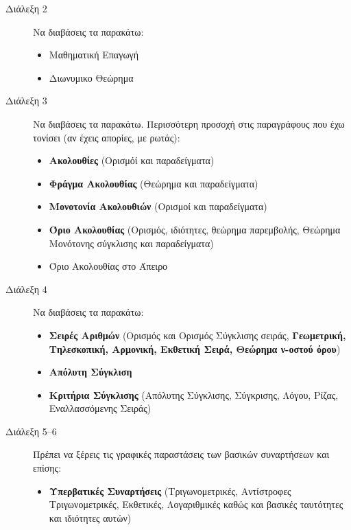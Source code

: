 \documentclass[a4paper,12pt]{article}
\begin{document}
\begin{center}
\end{center}

\vspace{\baselineskip}

\begin{description}
    \item[Διάλεξη 2] Να διαβάσεις τα παρακάτω:
  \begin{itemize}
    \item Μαθηματική Επαγωγή
    \item Διωνυμικο Θεώρημα
  \end{itemize}

  \item[Διάλεξη 3] Να διαβάσεις τα παρακάτω. Περισσότερη προσοχή
  στις παραγράφους που έχω τονίσει (αν έχεις απορίες, με ρωτάς):
  \begin{itemize}
    \item \textbf{Ακολουθίες} (Ορισμόί και παραδείγματα)
    \item \textbf{Φράγμα Ακολουθίας} (Θεώρημα και παραδείγματα)
    \item \textbf{Μονοτονία Ακολουθιών} (Ορισμοί και παραδείγματα)
    \item \textbf{Όριο Ακολουθίας} (Ορισμός, ιδιότητες, θεώρημα παρεμβολής,
    Θεώρημα
    Μονότονης σύγκλισης και παραδείγματα)
    \item {Όριο Ακολουθίας στο Άπειρο}
  \end{itemize}
  \item[Διάλεξη 4] Να διαβάσεις τα παρακάτω:
  \begin{itemize}
    \item \textbf{Σειρές Αριθμών} (Ορισμός και Ορισμός Σύγκλισης σειράς,
    \textbf{Γεωμετρική, Τηλεσκοπική, Αρμονική, Εκθετική Σειρά,
    Θεώρημα ν-οστού όρου})
    \item \textbf{Απόλυτη Σύγκλιση}
    \item \textbf{Κριτήρια Σύγκλισης} (Απόλυτης Σύγκλισης, Σύγκρισης, Λόγου,
    Ρίζας, Εναλλασσόμενης Σειράς)
  \end{itemize}
  \item[Διάλεξη 5--6] Πρέπει να ξέρεις τις γραφικές παραστάσεις των βασικών
  συναρτήσεων και επίσης:
  \begin{itemize}
    \item \textbf{Υπερβατικές Συναρτήσεις} (Τριγωνομετρικές, Αντίστροφες
    Τριγωνομετρικές, Εκθετικές, Λογαριθμικές καθώς και βασικές ταυτότητες
    και ιδιότητες αυτών)


\end{itemize}
\end{description}
\end{document}
